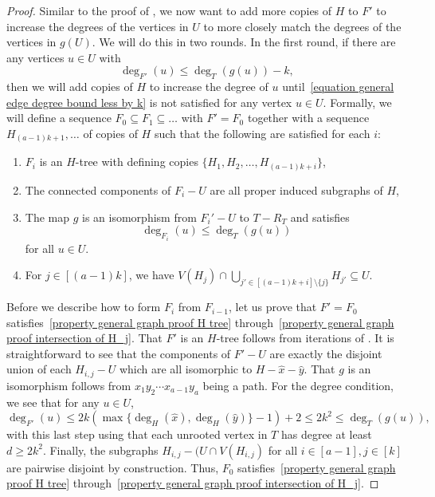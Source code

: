 \documentclass[12pt,letterpaper]{article}
\theoremstyle{definition}
\begin{document}
\begin{proof}
		Similar to the proof of , we now want to add more copies of $H$ to $F'$ to increase the degrees of the vertices in $U$ to more closely match the degrees of the vertices in $g(U)$. We will do this in two rounds. In the first round, if there are any vertices $u\in U$ with 
		\begin{equation}\label{equation general edge degree bound less by k}
			\deg_{F'}(u)\leq \deg_{T}(g(u))-k,
		\end{equation}
		then we will add copies of $H$ to increase the degree of $u$ until~\eqref{equation general edge degree bound less by k} is not satisfied for any vertex $u\in U$. Formally, we will define a sequence $F_0\subseteq F_1\subseteq\dots$ with $F'=F_0$ together with a sequence $H_{(a-1)k+1},\ldots$ of copies of $H$ such that the following are satisfied for each $i$:
		
		\begin{enumerate}[label=(G\arabic*)]
			\item $F_i$ is an $H$-tree with defining copies $\{H_1,H_2,\dots,H_{(a-1)k+i}\}$,\label{property general graph proof H tree}
			\item The connected components of $F_i-U$ are all proper induced subgraphs of $H$,\label{property general graph proof connected components}
			\item The map $g$ is an isomorphism from $F_i'-U$ to $T-R_T$ and satisfies
			\begin{equation}\label{equation general graph proof degree inequality}
				\deg_{F_i}(u)\le \deg_T(g(u))
			\end{equation}
			for all $u\in U$.\label{property general graph proof degree of spine}
			\item For $j\in [(a-1)k]$, we have $\displaystyle V(H_j)\cap \bigcup_{j'\in [(a-1)k+i]\setminus \{j\}}H_{j'}\subseteq U$.\label{property general graph proof intersection of H_j}
		\end{enumerate}
		
		Before we describe how to form $F_i$ from $F_{i-1}$, let us prove that $F'=F_0$ satisfies~\ref{property general graph proof H tree} through~\ref{property general graph proof intersection of H_j}. That $F'$ is an $H$-tree follows from iterations of .  It is straightforward to see that the components of $F'-U$ are exactly the disjoint union of each $H_{i,j}-U$ which are all isomorphic to $H-\hat{x}-\hat{y}$. That $g$ is an isomorphism follows from $x_1y_2\cdots x_{a-1}y_a$ being a path.  For the degree condition, we see that for any $u\in U$,
		\[
		\deg_{F'}(u)\leq 2k(\max\{\deg_H(\hat{x}),\deg_H(\hat{y})\}-1)+2\le 2k^2\leq \deg_{T}(g(u)),
		\]
		with this last step using that each unrooted vertex in $T$ has degree at least $d\ge 2k^2$. Finally, the subgraphs $H_{i,j}-(U\cap V(H_{i,j})$ for all $i\in [a-1],j\in [k]$ are pairwise disjoint by construction. Thus, $F_0$ satisfies~\ref{property general graph proof H tree} through~\ref{property general graph proof intersection of H_j}.
		

\end{proof}
\end{document}
